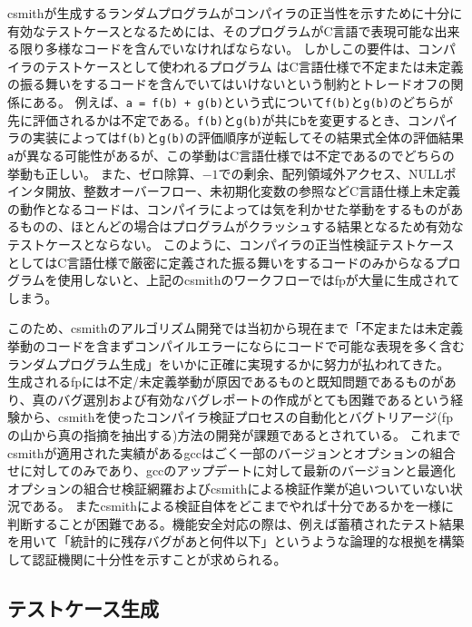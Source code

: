 \par
\acrshort{csmith}が生成するランダムプログラムがコンパイラの正当性を示すために十分に有効なテストケースとなるためには、そのプログラムがC言語で表現可能な出来る限り多様なコードを含んでいなければならない。
しかしこの要件は、コンパイラのテストケースとして使われるプログラム
はC言語仕様で不定または未定義の振る舞いをするコードを含んでいてはいけないという制約とトレードオフの関係にある。
例えば、\verb|a = f(b) + g(b)|という式について\verb|f(b)|と\verb|g(b)|のどちらが先に評価されるかは不定である。\verb|f(b)|と\verb|g(b)|が共に\verb|b|を変更するとき、コンパイラの実装によっては\verb|f(b)|と\verb|g(b)|の評価順序が逆転してその結果式全体の評価結果\verb|a|が異なる可能性があるが、この挙動はC言語仕様では不定であるのでどちらの挙動も正しい。
また、ゼロ除算、$-1$での剰余、配列領域外アクセス、NULLポインタ開放、整数オーバーフロー、未初期化変数の参照などC言語仕様上未定義の動作となるコードは、コンパイラによっては気を利かせた挙動をするものがあるものの、ほとんどの場合はプログラムがクラッシュする結果となるため有効なテストケースとならない。
このように、コンパイラの正当性検証テストケースとしてはC言語仕様で厳密に定義された振る舞いをするコードのみからなるプログラムを使用しないと、上記の\acrshort{csmith}のワークフローでは\acrshort{fp}が大量に生成されてしまう。
\par
このため、\acrshort{csmith}のアルゴリズム開発では当初から現在まで「不定または未定義挙動のコードを含まずコンパイルエラーにならにコードで可能な表現を多く含むランダムプログラム生成」をいかに正確に実現するかに努力が払われてきた。
生成される\acrshort{fp}には不定/未定義挙動が原因であるものと既知問題であるものがあり、真のバグ選別および有効なバグレポートの作成がとても困難であるという経験から、\acrshort{csmith}を使ったコンパイラ検証プロセスの自動化とバグトリアージ(\acrshort{fp}の山から真の指摘を抽出する)方法の開発が課題であるとされている。
これまで\acrshort{csmith}が適用された実績がある\acrshort{gcc}はごく一部のバージョンとオプションの組合せに対してのみであり、\acrshort{gcc}のアップデートに対して最新のバージョンと最適化オプションの組合せ検証網羅および\acrshort{csmith}による検証作業が追いついていない状況である。
また\acrshort{csmith}による検証自体をどこまでやれば十分であるかを一様に判断することが困難である。機能安全対応の際は、例えば蓄積されたテスト結果を用いて「統計的に残存バグがあと何件以下」というような論理的な根拠を構築して認証機関に十分性を示すことが求められる。
\subsection{テストケース生成}
